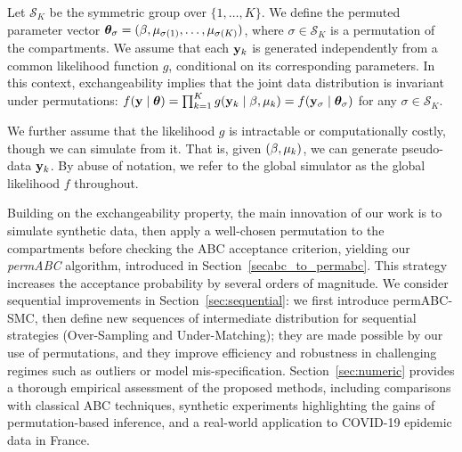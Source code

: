 Let $\mathcal S_K$ be the symmetric group over $\{1,\ldots,K\}$. 
We define the permuted parameter vector $\boldsymbol{\theta}_{\sigma} = (\beta, \mu_{\sigma(1)}, \dots, \mu_{\sigma(K)})$, where $\sigma \in \mathcal{S}_K$ is a permutation of the compartments. We assume that each $\mathbf{y}_k$ is generated independently from a common likelihood function $g$, conditional on its corresponding parameters. In this context, exchangeability implies that the joint data distribution is invariant under permutations: $f(\mathbf{y}\mid \boldsymbol{\theta}) = \prod_{k = 1}^K g(\mathbf{y}_k\mid \beta,\mu_k) = f(\mathbf{y}_{\sigma} \mid \boldsymbol{\theta}_{\sigma})$ for any $\sigma \in \mathcal{S}_K$. 

We further assume that the likelihood $g$ is intractable or computationally costly, though we can simulate from it. That is, given $(\beta,\mu_k)$, we can generate pseudo-data $\mathbf{y}_k$. By abuse of notation, we refer to the global simulator as the global likelihood $f$ throughout.


Building on the exchangeability property, the main innovation of our work is to simulate synthetic data, then apply a well-chosen permutation to the compartments before checking the ABC acceptance criterion, yielding our \emph{permABC} algorithm, introduced in Section~\ref{secabc_to_permabc}. This strategy increases the acceptance probability by several orders of magnitude. 
We consider sequential improvements in Section~\ref{sec:sequential}: we first introduce permABC-SMC, then  define new sequences of intermediate distribution for sequential strategies (Over-Sampling and Under-Matching); they are made possible by our use of permutations, and they improve efficiency and robustness in challenging regimes such as outliers or model mis-specification. Section~\ref{sec:numeric} provides a thorough empirical assessment of the proposed methods, including comparisons with classical ABC techniques, synthetic experiments highlighting the gains of permutation-based inference, and a real-world application to COVID-19 epidemic data in France.


